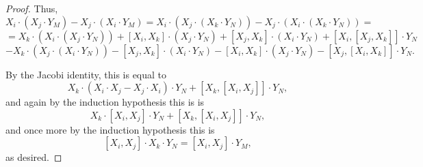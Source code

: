 \begin{proof}
Thus, 
$$X_i\cdot(X_j\cdot Y_M) - X_j\cdot(X_i\cdot Y_M) = X_i\cdot(X_j\cdot (X_k \cdot Y_N)) - X_j\cdot(X_i\cdot (X_k\cdot Y_N)) = $$
$$=X_k\cdot (X_i\cdot (X_j\cdot Y_N)) +[X_i,X_k]\cdot (X_j\cdot Y_N) +[X_j, X_k]\cdot (X_i\cdot Y_N)+ [X_i,[X_j, X_k]]\cdot Y_N $$
$$- X_k\cdot (X_j\cdot (X_i\cdot Y_N)) -[X_j,X_k]\cdot (X_i\cdot Y_N) -[X_i, X_k]\cdot(X_j\cdot Y_N)-  [X_j,[X_i, X_k]]\cdot Y_N.$$


By the Jacobi identity, this is equal to 
$$ X_k\cdot (X_i\cdot X_j - X_j\cdot X_i)\cdot Y_N + [X_k,[X_i, X_j]]\cdot Y_N,$$
and again by the induction hypothesis this is is
$$ X_k\cdot [X_i, X_j] \cdot Y_N + [X_k,[X_i, X_j]]\cdot Y_N,$$
and once more by the induction hypothesis this is 
$$ [X_i, X_j] \cdot X_k \cdot Y_N = [X_i,X_j]\cdot Y_M,$$
as desired. 

\end{proof}

